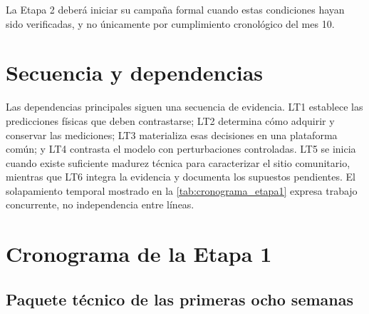 La Etapa 2 deberá iniciar su campaña formal cuando estas condiciones hayan sido
verificadas, y no únicamente por cumplimiento cronológico del mes 10.

\section{Secuencia y dependencias}

Las dependencias principales siguen una secuencia de evidencia. LT1 establece las
predicciones físicas que deben contrastarse; LT2 determina cómo adquirir y conservar las
mediciones; LT3 materializa esas decisiones en una plataforma común; y LT4 contrasta el
modelo con perturbaciones controladas. LT5 se inicia cuando existe suficiente madurez
técnica para caracterizar el sitio comunitario, mientras que LT6 integra la evidencia y
documenta los supuestos pendientes. El solapamiento temporal mostrado en la
\cref{tab:cronograma_etapa1} expresa trabajo concurrente, no independencia entre líneas.

\section{Cronograma de la Etapa 1}

\subsection{Paquete técnico de las primeras ocho semanas}
\label{sec:eight_week_package}

